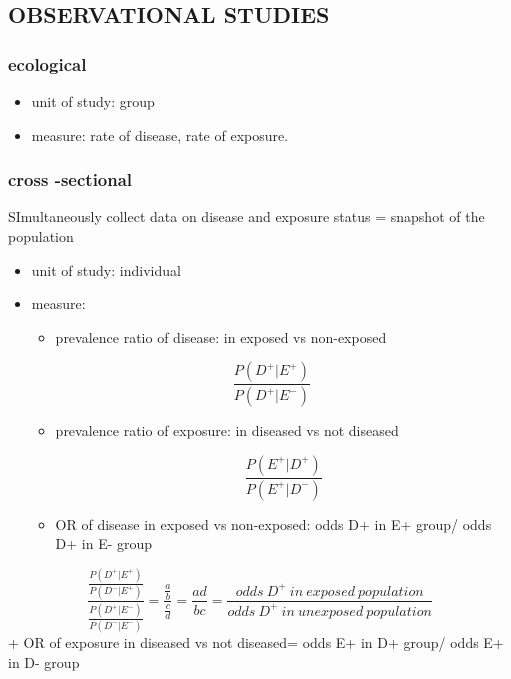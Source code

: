 \documentclass[
]{article}
\providecommand{\tightlist}{%
  \setlength{\itemsep}{0pt}\setlength{\parskip}{0pt}}
\begin{document}
\hypertarget{observational-studies}{%
\subsection{OBSERVATIONAL STUDIES}\label{observational-studies}}

\hypertarget{ecological}{%
\subsubsection{ecological}\label{ecological}}

\begin{itemize}
\item
  unit of study: group
\item
  measure: rate of disease, rate of exposure.
\end{itemize}

\hypertarget{cross--sectional}{%
\subsubsection{cross -sectional}\label{cross--sectional}}

SImultaneously collect data on disease and exposure status = snapshot of
the population

\begin{itemize}
\item
  unit of study: individual
\item
  measure:

  \begin{itemize}
  \tightlist
  \item
    prevalence ratio of disease: in exposed vs non-exposed
  \end{itemize}

  \[\frac{P(D^+|E^+)}{P(D^+|E^-)}\]

  \begin{itemize}
  \item
    prevalence ratio of exposure: in diseased vs not diseased

    \[\frac{P(E^+|D^+)}{P(E^+|D^-)}\]
  \item
    OR of disease in exposed vs non-exposed: odds D+ in E+ group/ odds
    D+ in E- group
  \end{itemize}
\end{itemize}

\[\frac{\frac{P(D^+|E^+)}{P(D^-|E^+)}}{\frac{P(D^+|E^-)}{P(D^-|E^-)}}=\frac{\frac{a}{b}}{\frac{c}{d}}=\frac{ad}{bc}=\frac{odds\:D^+\:in\:exposed\:population}{odds\:D^+\:in\:unexposed\:population}\]
+ OR of exposure in diseased vs not diseased= odds E+ in D+ group/ odds
E+ in D- group
\end{document}

